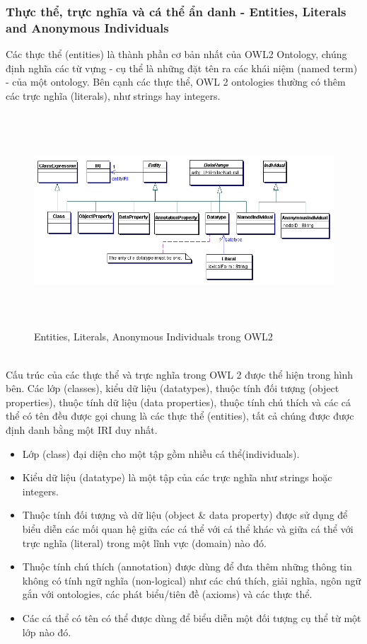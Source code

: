 \subsubsection{Thực thể, trực nghĩa và cá thể ẩn danh - Entities, Literals and Anonymous Individuals}
Các thực thể (entities) là thành phần cơ bản nhất của OWL2 Ontology, chúng định nghĩa các từ vựng - cụ thể là những đặt tên ra các khái niệm (named term) - của một ontology. Bên cạnh các thực thể, OWL 2 ontologies thường có thêm các trực nghĩa (literals), như strings hay integers.
\begin{figure}[ht!]
	\centering
	\includegraphics[width=155mm, height=80mm]{Figures/entities.png}
	\caption{Entities, Literals, Anonymous Individuals trong OWL2 \label{overflow}}
\end{figure}
\\
Cấu trúc của các thực thể và trực nghĩa trong OWL 2 được thể hiện trong hình bên. Các lớp (classes), kiểu dữ liệu (datatypes), thuộc tính đối tượng (object properties), thuộc tính dữ liệu (data properties), thuộc tính chú thích và các cá thể có tên đều được gọi chung là các thực thể (entities), tất cả chúng được được định danh bằng một IRI duy nhất. 
\begin{itemize}
	\item Lớp (class) đại diện cho một tập gồm nhiều cá thể(individuals).
	\item Kiểu dữ liệu (datatype) là một tập của các trực nghĩa như strings hoặc integers.
	\item Thuộc tính đối tượng và dữ liệu (object \& data property) được sử dụng để biểu diễn các mối quan hệ giữa các cá thể với cá thể khác và giữa cá thể với trực nghĩa (literal) trong một lĩnh vực (domain) nào đó.
	\item Thuộc tính chú thích (annotation) được dùng để đưa thêm những thông tin không có tính ngữ nghĩa (non-logical) như các chú thích, giải nghĩa, ngôn ngữ gắn với ontologies, các phát biểu/tiên đề (axioms) và các thực thể.
	\item  Các cá thể có tên có thể được dùng để biểu diễn một đối tượng cụ thể từ một lớp nào đó.
\end{itemize}
